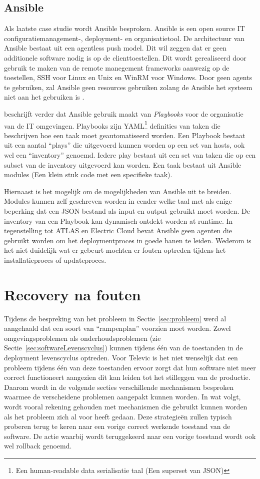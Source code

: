 \subsection{Ansible}
Als laatste case studie wordt Ansible besproken.
Ansible is een open source IT configuratiemanagement-, deployment- en organisatietool.
De architectuur van Ansible bestaat uit een agentless push model.
Dit wil zeggen dat er geen additionele software nodig is op de clienttoestellen.
Dit wordt gerealiseerd door gebruik te maken van de remote manegement frameworks aanwezig op de toestellen, SSH voor Linux en Unix en WinRM voor Windows.
Door geen agents te gebruiken, zal Ansible geen resources gebruiken zolang de Ansible het systeem niet aan het gebruiken is \citep{ansible}.

\citep{ansible} beschrijft verder dat Ansible gebruik maakt van \emph{Playbooks} voor de organisatie van de IT omgevingen.
Playbooks zijn YAML\footnote{Een human-readable data serialisatie taal (Een superset van JSON)} definities van taken die beschrijven hoe een taak moet geautomatiseerd worden.
Een Playbook bestaat uit een aantal ``plays'' die uitgevoerd kunnen worden op een set van hosts, ook wel een ``inventory'' genoemd.
Iedere play bestaat uit een set van taken die op een subset van de inventory uitgevoerd kan worden.
Een taak bestaat uit Ansible modules (Een klein stuk code met een specifieke taak).

Hiernaast is het mogelijk om de mogelijkheden van Ansible uit te breiden.
Modules kunnen zelf geschreven worden in eender welke taal met als enige beperking dat een JSON bestand als input en output gebruikt moet worden.
De inventory van een Playbook kan dynamisch ontdekt worden at runtime.
In tegenstelling tot ATLAS en Electric Cloud bevat Ansible geen agenten die gebruikt worden om het deploymentproces in goede banen te leiden.
Wederom is het niet duidelijk wat er gebeurt mochten er fouten optreden tijdens het installatieproces of updateproces.

\section{Recovery na fouten}\label{sec:rollback}
Tijdens de bespreking van het probleem in Sectie~\ref{sec:probleem} werd al aangehaald dat een soort van ``rampenplan'' voorzien moet worden.
Zowel omgevingsproblemen als onderhoudsproblemen (zie Sectie~\ref{sec:softwareLevenscyclus}) kunnen tijdens één van de toestanden in de deployment levenscyclus optreden.
Voor Televic is het niet wenselijk dat een probleem tijdens één van deze toestanden ervoor zorgt dat hun software niet meer correct functioneert aangezien dit kan leiden tot het stilleggen van de productie.
Daarom wordt in de volgende secties verschillende mechanismen besproken waarmee de verscheidene problemen aangepakt kunnen worden.
In wat volgt, wordt vooral rekening gehouden met mechanismen die gebruikt kunnen worden als het probleem zich al voor heeft gedaan.
Deze strategieën zullen typisch proberen terug te keren naar een vorige correct werkende toestand van de software.
De actie waarbij wordt teruggekeerd naar een vorige toestand wordt ook wel rollback genoemd.


